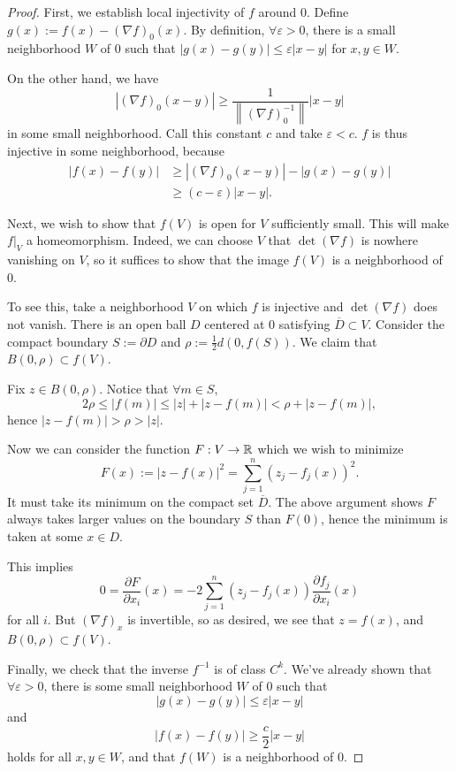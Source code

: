 \begin{proof}
    First, we establish local injectivity of $f$ around $0$. Define $g(x):=f(x)-(\nabla f)_0(x)$. By definition, $\forall\varepsilon>0$, there is a small neighborhood $W$ of $0$ such that $|g(x)-g(y)|\leq\varepsilon|x-y|$ for $x,y\in W$.

    On the other hand, we have
    $$|(\nabla f)_0(x-y)|\geq\frac{1}{\left\|(\nabla f)_0^{-1}\right\|}|x-y|$$
    in some small neighborhood. Call this constant $c$ and take $\varepsilon<c$. $f$ is thus injective in some neighborhood, because
    \begin{align*}
        |f(x)-f(y)| &\geq |(\nabla f)_0(x-y)|-|g(x)-g(y)| \\
        &\geq (c-\varepsilon)|x-y|.
    \end{align*}
    
    Next, we wish to show that $f(V)$ is open for $V$ sufficiently small. This will make $f|_V$ a homeomorphism. Indeed, we can choose $V$ that $\det(\nabla f)$ is nowhere vanishing on $V$, so it suffices to show that the image $f(V)$ is a neighborhood of $0$.

    To see this, take a neighborhood $V$ on which $f$ is injective and $\det(\nabla f)$ does not vanish. There is an open ball $D$ centered at $0$ satisfying $\overline{D}\subset V$. Consider the compact boundary $S:=\partial D$ and $\rho:=\frac{1}{2}d(0,f(S))$. We claim that $B(0,\rho)\subset f(V)$.

    Fix $z\in B(0,\rho)$. Notice that $\forall m\in S$,
    $$2\rho\leq|f(m)|\leq|z|+|z-f(m)|<\rho+|z-f(m)|,$$
    hence $|z-f(m)|>\rho>|z|$. 

    Now we can consider the function $F:V\to\mathbb{R}$ which we wish to minimize
    $$F(x):=|z-f(x)|^2=\sum_{j=1}^n(z_j-f_j(x))^2.$$
    It must take its minimum on the compact set $\overline{D}$. The above argument shows $F$ always takes larger values on the boundary $S$ than $F(0)$, hence the minimum is taken at some $x\in D$. 
    
    This implies
    $$0=\frac{\partial F}{\partial x_i}(x)=-2\sum_{j=1}^n(z_j-f_j(x))\frac{\partial f_j}{\partial x_i}(x)$$
    for all $i$. But $(\nabla f)_x$ is invertible, so as desired, we see that $z=f(x)$, and $B(0,\rho)\subset f(V)$.

    Finally, we check that the inverse $f^{-1}$ is of class $C^k$. We've already shown that $\forall\varepsilon>0$, there is some small neighborhood $W$ of 0 such that
    $$|g(x)-g(y)|\leq\varepsilon|x-y|$$
    and
    $$|f(x)-f(y)|\geq\frac{c}{2}|x-y|$$
    holds for all $x,y\in W$, and that $f(W)$ is a neighborhood of $0$.


\end{proof}
